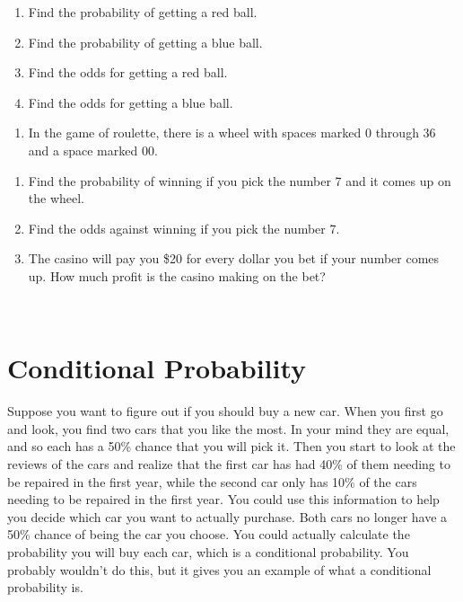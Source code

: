 \documentclass[]{book}
\providecommand{\tightlist}{%
  \setlength{\itemsep}{0pt}\setlength{\parskip}{0pt}}
\begin{document}
\begin{enumerate}
\def\labelenumi{\alph{enumi}.}
\tightlist
\item
  Find the probability of getting a red ball.
\item
  Find the probability of getting a blue ball.
\item
  Find the odds for getting a red ball.
\item
  Find the odds for getting a blue ball.
\end{enumerate}

\begin{enumerate}
\def\labelenumi{\arabic{enumi}.}
\setcounter{enumi}{7}
\tightlist
\item
  In the game of roulette, there is a wheel with spaces marked 0
  through 36 and a space marked 00.
\end{enumerate}

\begin{enumerate}
\def\labelenumi{\alph{enumi}.}
\tightlist
\item
  Find the probability of winning if you pick the number 7 and it
  comes up on the wheel.
\item
  Find the odds against winning if you pick the number 7.
\item
  The casino will pay you \$20 for every dollar you bet if your number
  comes up. How much profit is the casino making on the bet?
\end{enumerate}

\textbf{\\
}

\hypertarget{conditional-probability}{%
\section{Conditional Probability}\label{conditional-probability}}

Suppose you want to figure out if you should buy a new car. When you first go and look, you find two cars that you like the most. In your mind they are equal, and so each has a 50\% chance that you will pick it. Then you start to look at the reviews of the cars and realize that the first car has had 40\% of them needing to be repaired in the first year, while the second car only has 10\% of the cars needing to be repaired in the first year. You could use this information to help you decide which car you want to actually purchase. Both cars no longer have a 50\% chance of being the car you choose. You could actually calculate the probability you will buy each car, which is a conditional probability. You probably wouldn't do this, but it gives you an example of what a conditional probability is.
\end{document}
